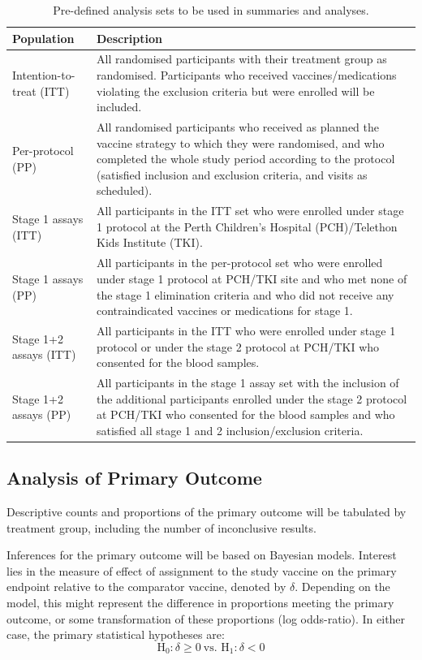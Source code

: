 \documentclass{bmcart}
\begin{document}
\renewcommand{\arraystretch}{2}
\begin{table}[!ht]
	\caption{Pre-defined analysis sets to be used in summaries and analyses.}
	\label{tab:analysis-sets}
	\begin{tabular}{lp{8cm}}
		Population & Description \\ \hline
		Intention-to-treat (ITT) & All randomised participants with their treatment group as randomised. Participants who received vaccines/medications violating the exclusion criteria but were enrolled will be included. \\
		Per-protocol (PP) & All randomised participants who received as planned the vaccine strategy to which they were randomised, and who completed the whole study period according to the protocol (satisfied inclusion and exclusion criteria, and visits as scheduled).
		\\
		Stage 1 assays (ITT) & All participants in the ITT set who were enrolled under stage 1 protocol at the Perth Children's Hospital (PCH)/Telethon Kids Institute (TKI). \\
		Stage 1 assays (PP) & All participants in the per-protocol set who were enrolled under stage 1 protocol at PCH/TKI site and who met none of the stage 1 elimination criteria and who did not receive any contraindicated vaccines or medications for stage 1.\\
		Stage 1+2 assays (ITT) & All participants in the ITT  who were enrolled under stage 1 protocol or under the stage 2 protocol at PCH/TKI who consented for the blood samples. \\
		Stage 1+2 assays (PP) & All participants in the stage 1 assay set with the inclusion of the additional participants enrolled under the stage 2 protocol at PCH/TKI who consented for the blood samples and who satisfied all stage 1 and 2 inclusion/exclusion criteria. \\
		\hline
	\end{tabular}
\end{table}
\renewcommand{\arraystretch}{1.25}

\subsection*{Analysis of Primary Outcome}

Descriptive counts and proportions of the primary outcome will be tabulated by treatment group, including the number of inconclusive results.

Inferences for the primary outcome will be based on Bayesian models. Interest lies in the measure of effect of assignment to the study vaccine on the primary endpoint relative to the comparator vaccine, denoted by \(\delta\).
Depending on the model, this might represent the difference in proportions meeting the primary outcome, or some transformation of these proportions (log odds-ratio).
In either case, the primary statistical hypotheses are:
$$
\textrm{H}_0:\delta\geq 0\ \text{vs. } \mathrm{H}_1:\delta <0
$$
\end{document}
